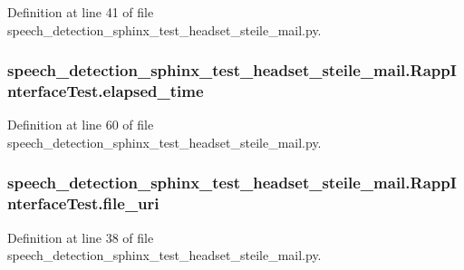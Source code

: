 Definition at line 41 of file speech\-\_\-detection\-\_\-sphinx\-\_\-test\-\_\-headset\-\_\-steile\-\_\-mail.\-py.

\hypertarget{classspeech__detection__sphinx__test__headset__steile__mail_1_1RappInterfaceTest_a73029b423f48d57aef0ca43126dec755}{
\subsubsection[{elapsed\-\_\-time}]{\setlength{\rightskip}{0pt plus 5cm}speech\-\_\-detection\-\_\-sphinx\-\_\-test\-\_\-headset\-\_\-steile\-\_\-mail.\-Rapp\-Interface\-Test.\-elapsed\-\_\-time}}\label{classspeech__detection__sphinx__test__headset__steile__mail_1_1RappInterfaceTest_a73029b423f48d57aef0ca43126dec755}


Definition at line 60 of file speech\-\_\-detection\-\_\-sphinx\-\_\-test\-\_\-headset\-\_\-steile\-\_\-mail.\-py.

\hypertarget{classspeech__detection__sphinx__test__headset__steile__mail_1_1RappInterfaceTest_a52b778bf75da2710dfe12a92b8133d96}{
\subsubsection[{file\-\_\-uri}]{\setlength{\rightskip}{0pt plus 5cm}speech\-\_\-detection\-\_\-sphinx\-\_\-test\-\_\-headset\-\_\-steile\-\_\-mail.\-Rapp\-Interface\-Test.\-file\-\_\-uri}}\label{classspeech__detection__sphinx__test__headset__steile__mail_1_1RappInterfaceTest_a52b778bf75da2710dfe12a92b8133d96}


Definition at line 38 of file speech\-\_\-detection\-\_\-sphinx\-\_\-test\-\_\-headset\-\_\-steile\-\_\-mail.\-py.

